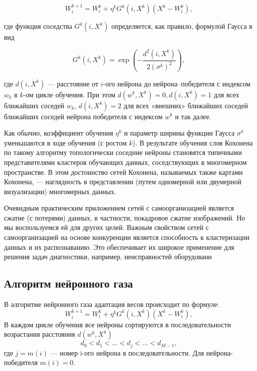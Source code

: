 \begin{equation}
W _ { i } ^ { k + 1 } = W _ { i } ^ { k } + \eta ^ { k } G ^ { k } \left( i , X ^ { k } \right) \left( X ^ { k } - W _ { i } ^ { k } \right),
\end{equation}


где функция соседства $G ^ { k } \left( i , X ^ { k } \right)$ определяется, как правило, формулой Гаусса в вид

\begin{equation}
G ^ { k } \left( i , X ^ { k } \right) = \exp \left( - \frac { d ^ { 2 } \left( i , X ^ { k } \right) } { 2 \left( \sigma ^ { k } \right) ^ { 2 } } \right),
\end{equation}

где $d \left( i , X ^ { k } \right)$ ---  расстояние от $i$-ого нейрона до нейрона–победителя с индексом $w_k$ в $k$-ом цикле обучения. При этом $d \left( w ^ { k } , X ^ { k } \right) = 0 , d \left( i , X ^ { k } \right) = 1$ для всех ближайших соседей $w_k$, $d(i, X^k) = 2$ для всех «внешних» ближайших соседей ближайших соседей нейрона победителя с индексом $w^k$ и так далее.

Как обычно, коэффициент обучения $\eta^k$ и параметр ширины функции
Гаусса $\sigma^k$ уменьшаются в ходе обучения (с ростом $k$). В результате обучения слоя Кохонена по такому алгоритму топологически
соседние нейроны становятся типичными представителями кластеров обучающих данных, соседствующих в многомерном пространстве.
В этом достоинство сетей Кохонена, называемых также картами Кохонена, — наглядность в представлении (путем одномерной или двумерной
визуализации) многомерных данных.

Очевидным практическим приложением сетей с самоорганизацией является
сжатие (с потерями) данных, в частности, покадровое сжатие изображений.
Но мы воспользуемся ей для других целей.
Важным свойством сетей с самоорганизацией на основе конкуренции
является способность к кластеризации данных и их распознаванию. Это
обеспечивает их широкое применение для решения задач диагностики,
например, неисправностей оборудовани


\subsection{Алгоритм нейронного газа}
В алгоритме нейронного газа адаптация весов происходит по формуле:
\begin{equation}\label{equ:weightCalc}
    W _ { i } ^ { k + 1 } = W _ { i } ^ { k } + \eta ^ { k } G ^ { k } \left( i , X ^ { k } \right) \left( X ^ { k } - W _ { i } ^ { k } \right),
\end{equation}
В каждом цикле обучения все нейроны сортируются в последовательности возрастания расстояния $d(w^k, X^k)$
\begin{equation}\label{equ:compareLenght}
    d _ { 0 } < d _ { 1 } < \ldots < d _ { j } < \ldots < d _ { M - 1 },
\end{equation}
где $j=m(i)$ — номер i-ого нейрона в последовательности. Для нейрона-победителя $m(i)=0$.


